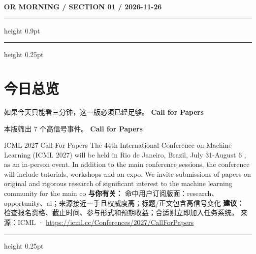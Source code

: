 \documentclass[10.5pt]{ctexart}
\begin{document}
{\small\bfseries OR MORNING / SECTION 01 / 2026-11-26}
\vspace{2mm}
\hrule height 0.9pt
\vspace{1.5mm}
\hrule height 0.25pt
\vspace{4mm}
\section*{今日总览}
{\color{ormuted} 如果今天只能看三分钟，这一版必须已经足够。}
\vspace{2mm}
{\fontsize{25}{29}\selectfont\bfseries Call for Papers}\par
\vspace{2mm}
{\large 本版筛出 7 个高信号事件。}
\vspace{3mm}
{\Large\bfseries Call for Papers}\par
ICML 2027 Call For Papers The 44th International Conference on Machine Learning (ICML 2027) will be held in Rio de Janeiro, Brazil, July 31-August 6 , as an in-person event. In addition to the main conference sessions, the conference will include tutorials, workshops and an expo. We invite submissions of papers on original and rigorous research of significant interest to the machine learning community for the main co
\textbf{与你有关：} 命中用户订阅版面：research、opportunity、ai；来源接近一手且权威度高；标题/正文包含高信号变化
\textbf{建议：} 检查报名资格、截止时间、参与形式和预期收益；合适则立即加入任务系统。
{\footnotesize\color{ormuted} 来源：ICML · \url{https://icml.cc/Conferences/2027/CallForPapers}}
\vspace{3mm}
\hrule height 0.25pt
\vspace{3mm}
\end{document}
